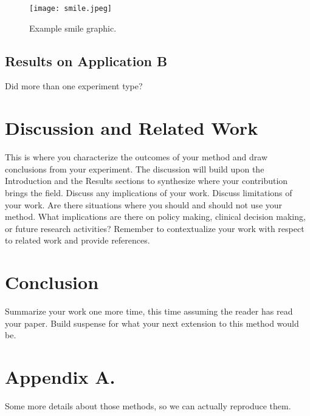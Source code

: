 \documentclass[twoside,11pt]{article}
\begin{document}
\begin{figure}[htbp]
  \centering 
  \texttt{[image: smile.jpeg]} 
  \caption{Example smile graphic.}
  \label{fig:example} 
\end{figure} 

\subsection{Results on Application B} 

Did more than one experiment type?

\section{Discussion and Related Work} 

This is where you characterize the outcomes of your method and draw conclusions from your experiment.
The discussion will build upon the Introduction and the Results sections to synthesize where your contribution brings the field. Discuss any implications of your work. 
Discuss limitations of your work.
Are there situations where you should and should not use your method.
What implications are there on policy making, clinical decision making, or future research activities?
Remember to contextualize your work with respect to related work and provide references.

\section{Conclusion} 
Summarize your work one more time, this time assuming the reader has read your paper.
Build suspense for what your next extension to this method would be.




\appendix
\section*{Appendix A.}
Some more details about those methods, so we can actually reproduce them.
\end{document}
